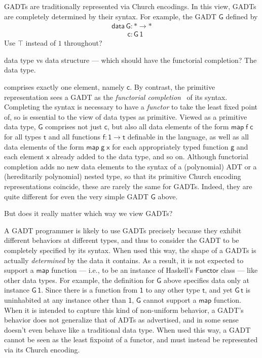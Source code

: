 \documentclass[acmsmall,screen,review,anonymous]{acmart}
\theoremstyle{definition}
\begin{document}
GADTs are traditionally represented via Church encodings. In this
view, GADTs are completely determined by their syntax. For example,
the GADT $\mathsf{G}$ defined by
\[\begin{array}{l}
\mathsf{data\,G : * \to *}\\
\mathsf{\;\;\;\;\;\;\;\;c : G\,1}
\end{array}\]
{\color{blue} Use $\top$ instead of $1$ throughout?}

\noindent
{\color{blue} data type vs data structure --- which should have the
functorial completion? The data type.}

\noindent
comprises exactly one element, namely $\mathsf{c}$. By contrast, the
primitive representation sees a GADT as the {\em functorial
  completion}~\cite{jp19} of its syntax. {\color{blue} Completing the
  syntax is necessary to have a {\em functor} to take the least fixed
  point of, so is essential to the view of data types as primitive.}
Viewed as a primitive data type, $\mathsf{G}$ comprises not just
$\mathsf{c}$, but also all data elements of the form
$\mathsf{map\;f\;c}$ for all types $\mathsf{t}$ and all functions
$\mathsf{f : 1 \to t}$ definable in the language, as well as all data
elements of the form $\mathsf{map\;g\;x}$ for each appropriately typed
function $\mathsf{g}$ and each element $\mathsf{x}$ already added to
the data type, and so on.  Although functorial completion adds no new
data elements to the syntax of a (polynomial) ADT or a (hereditarily
polynomial) nested type, so that its primitive Church encoding
representations coincide, these are rarely the same for GADTs.
Indeed, they are quite different for even the very simple GADT
$\mathsf{G}$ above.

But does it really matter which way we view GADTs?

A GADT programmer is likely to use GADTs precisely because they
exhibit different behaviors at different types, and thus to consider
the GADT to be completely specified by its syntax. When used this way,
the shape of a GADTs is actually {\em determined} by the data it
contains. As a result, it is not expected to support a $\mathsf{map}$
function --- i.e., to be an instance of Haskell's $\mathsf{Functor}$
class --- like other data types. For example, the definition for
$\mathsf{G}$ above specifies data only at instance $\mathsf{G\,1}$.
Since there is a function from $\mathsf{1}$ to any other type
$\mathsf{t}$, and yet $\mathsf{G\,t}$ is uninhabited at any instance
other than $\mathsf{1}$, $\mathsf{G}$ cannot support a $\mathsf{map}$
function. When it is intended to capture this kind of non-uniform
behavior, a GADT's behavior does not generalize that of ADTs as
advertised, and in some sense doesn't even behave like a traditional
data type.  When used this way, a GADT cannot be seen as the least
fixpoint of a functor, and must instead be represented via its Church
encoding.
\end{document}
